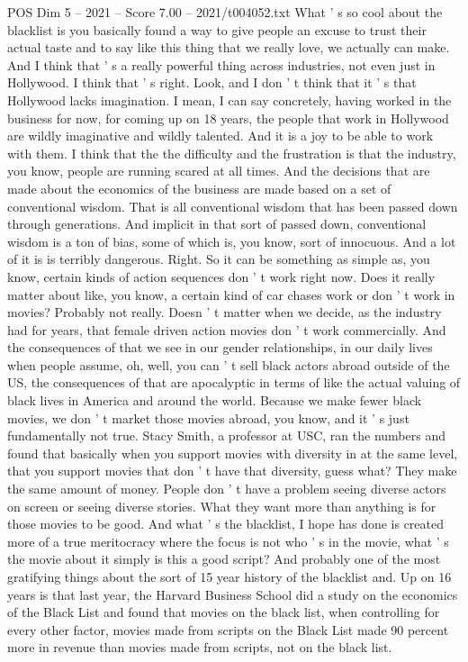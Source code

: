 \begin{textsample}{POS Dim 5 – 2021 – Score 7.00 – 2021/t004052.txt}
What ' s so cool about the blacklist is you basically found a way to give people an excuse to trust their actual taste and to say like this thing that we really love, we actually can make.
And I think that ' s a really powerful thing across industries, not even just in Hollywood.
I think that ' s right.
Look, and I don ' t think that it ' s that Hollywood lacks imagination.
I mean, I can say concretely, having worked in the business for now, for coming up on 18 years, the people that work in Hollywood are wildly imaginative and wildly talented.
And it is a joy to be able to work with them.
I think that the the difficulty and the frustration is that the industry, you know, people are running scared at all times.
And the decisions that are made about the economics of the business are made based on a set of conventional wisdom.
That is all conventional wisdom that has been passed down through generations.
And implicit in that sort of passed down, conventional wisdom is a ton of bias, some of which is, you know, sort of innocuous.
And a lot of it is is terribly dangerous.
Right.
So it can be something as simple as, you know, certain kinds of action sequences don ' t work right now.
Does it really matter about like, you know, a certain kind of car chases work or don ' t work in movies?
Probably not really.
Doesn ' t matter when we decide, as the industry had for years, that female driven action movies don ' t work commercially.
And the consequences of that we see in our gender relationships, in our daily lives when people assume, oh, well, you can ' t sell black actors abroad outside of the US, the consequences of that are apocalyptic in terms of like the actual valuing of black lives in America and around the world.
Because we make fewer black movies, we don ' t market those movies abroad, you know, and it ' s just fundamentally not true.
Stacy Smith, a professor at USC, ran the numbers and found that basically when you support movies with diversity in at the same level, that you support movies that don ' t have that diversity, guess what?
They make the same amount of money.
People don ' t have a problem seeing diverse actors on screen or seeing diverse stories.
What they want more than anything is for those movies to be good.
And what ' s the blacklist, I hope has done is created more of a true meritocracy where the focus is not who ' s in the movie, what ' s the movie about it simply is this a good script?
And probably one of the most gratifying things about the sort of 15 year history of the blacklist and.
Up on 16 years is that last year, the Harvard Business School did a study on the economics of the Black List and found that movies on the black list, when controlling for every other factor, movies made from scripts on the Black List made 90 percent more in revenue than movies made from scripts, not on the black list.

\end{textsample}
